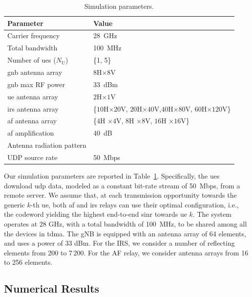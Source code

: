 \def\arraystretch{1.3}
\begin{table}[t!]
  \caption{Simulation parameters.}
  \label{Tab:parameters}
  \centering
  \footnotesize
  \begin{tabular}{l|l}
    \toprule
    Parameter                  & Value \\ \midrule
    Carrier frequency		   & 28~GHz	\\
    Total bandwidth			   & 100~MHz \\
    Number of \glspl{ue} ($N_{\mathrm U}$)  & \{1, 5\} \\
    \gls{gnb} antenna array    & $8$H$\times8$V \\
    \gls{gnb} max RF power	   & 33~dBm \\
    \gls{ue} antenna array     & $2$H$\times1$V \\
    \gls{irs} antenna array    & \{$10$H$\times20$V, $20$H$\times40$V,$ 40$H$\times80$V, $60$H$\times120$V\} \\
    \gls{af} antenna array     & \{$4$H $\times4$V, $8$H $\times8$V, $16$H $\times16$V\} \\
    \gls{af} amplification & 40~dB \\
    Antenna radiation pattern  & \cite[Table 7.3-1]{3gpp.38.901} \\
    UDP source rate			   & 50~Mbps\\
    \bottomrule
  \end{tabular}
\end{table}

Our simulation parameters are reported in Table~\ref{Tab:parameters}.
Specifically, the \glspl{ue} download \gls{udp} data, modeled as a constant bit-rate stream of 50~Mbps, from a remote server. 
We assume that, at each transmission opportunity towards the generic $k$-th \gls{ue}, both \gls{af} and \gls{irs} relays can use their optimal configuration, i.e., the codeword yielding the highest end-to-end \gls{sinr} towards \gls{ue} $k$.
The system operates at 28 GHz, with a total bandwidth of 100~MHz, to be shared among all the devices in \gls{tdma}. 
The gNB is equipped with an antenna array of 64 elements, and uses a power of 33 dBm.
For the IRS, we consider a number of reflecting elements from 200 to 7\,200.
For the AF relay, we consider antenna arrays from 16 to 256 elements.%


\subsection{Numerical Results} %
\label{sub:numerical_results}

